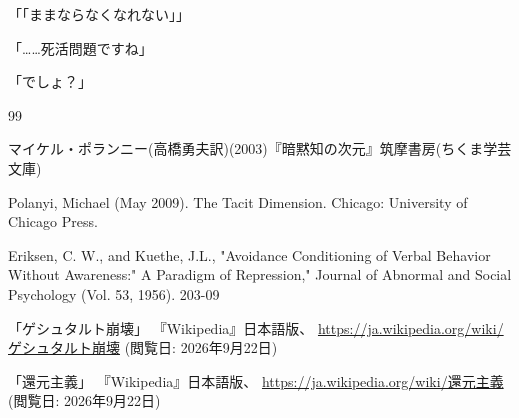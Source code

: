 \documentclass[paper=b5j]{jlreq}
\begin{document}
「「ままならなくなれない」」

「……死活問題ですね」

「でしょ？」

\begin{thebibliography}{99}

マイケル・ポランニー(高橋勇夫訳)(2003)『暗黙知の次元』筑摩書房(ちくま学芸文庫)

Polanyi, Michael (May 2009). The Tacit Dimension. Chicago: University of Chicago Press.

Eriksen, C. W., and Kuethe, J.L., "Avoidance Conditioning of Verbal Behavior Without Awareness:" A Paradigm of Repression," Journal of Abnormal and Social Psychology (Vol. 53, 1956). 203-09

「ゲシュタルト崩壊」
『Wikipedia』日本語版、
\url{https://ja.wikipedia.org/wiki/ゲシュタルト崩壊}
(閲覧日: 2026年9月22日)

「還元主義」
『Wikipedia』日本語版、
\url{https://ja.wikipedia.org/wiki/還元主義}
(閲覧日: 2026年9月22日)

\end{thebibliography}
\end{document}
